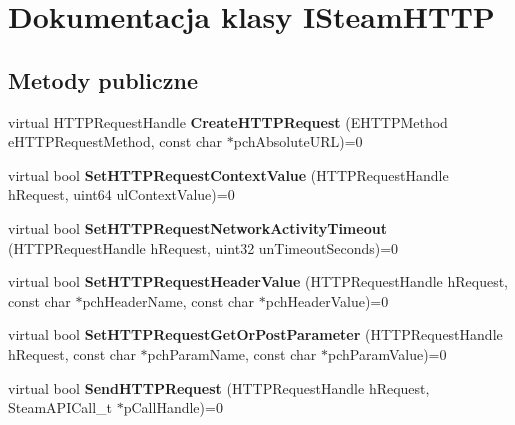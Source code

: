 \hypertarget{class_i_steam_h_t_t_p}{}\section{Dokumentacja klasy I\+Steam\+H\+T\+TP}
\label{class_i_steam_h_t_t_p}
\subsection*{Metody publiczne}
\begin{DoxyCompactItemize}
\item 
\mbox{\label{class_i_steam_h_t_t_p_acaee24bdd93444e497f810d7ccb36329}} 
virtual H\+T\+T\+P\+Request\+Handle {\bfseries Create\+H\+T\+T\+P\+Request} (E\+H\+T\+T\+P\+Method e\+H\+T\+T\+P\+Request\+Method, const char $\ast$pch\+Absolute\+U\+RL)=0
\item 
\mbox{\label{class_i_steam_h_t_t_p_a5d37146c40c7bb8c20ff6ca2b89e7a05}} 
virtual bool {\bfseries Set\+H\+T\+T\+P\+Request\+Context\+Value} (H\+T\+T\+P\+Request\+Handle h\+Request, uint64 ul\+Context\+Value)=0
\item 
\mbox{\label{class_i_steam_h_t_t_p_a6c1a701435ae6dac27d0d81a18c05094}} 
virtual bool {\bfseries Set\+H\+T\+T\+P\+Request\+Network\+Activity\+Timeout} (H\+T\+T\+P\+Request\+Handle h\+Request, uint32 un\+Timeout\+Seconds)=0
\item 
\mbox{\label{class_i_steam_h_t_t_p_a7e5df5305240444c368afbc4ba2e3a4b}} 
virtual bool {\bfseries Set\+H\+T\+T\+P\+Request\+Header\+Value} (H\+T\+T\+P\+Request\+Handle h\+Request, const char $\ast$pch\+Header\+Name, const char $\ast$pch\+Header\+Value)=0
\item 
\mbox{\label{class_i_steam_h_t_t_p_a87eb32d1aafb3c213b4e33b704c8e3de}} 
virtual bool {\bfseries Set\+H\+T\+T\+P\+Request\+Get\+Or\+Post\+Parameter} (H\+T\+T\+P\+Request\+Handle h\+Request, const char $\ast$pch\+Param\+Name, const char $\ast$pch\+Param\+Value)=0
\item 
\mbox{\label{class_i_steam_h_t_t_p_a17cf6ae31cbf24b7767689574cd3bb57}} 
virtual bool {\bfseries Send\+H\+T\+T\+P\+Request} (H\+T\+T\+P\+Request\+Handle h\+Request, Steam\+A\+P\+I\+Call\+\_\+t $\ast$p\+Call\+Handle)=0

\end{DoxyCompactItemize}
